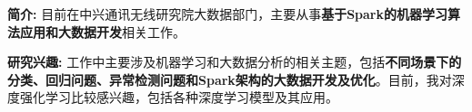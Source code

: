 %
%

\par{
{\textbf{简介:}} 
目前在中兴通讯无线研究院大数据部门，主要从事\textbf{基于Spark的机器学习算法应用和大数据开发}相关工作。


{\textbf{研究兴趣:}} 
工作中主要涉及机器学习和大数据分析的相关主题，包括\textbf{不同场景下的分类、回归问题、异常检测问题和Spark架构的大数据开发及优化}。目前，我对深度强化学习比较感兴趣，包括各种深度学习模型及其应用。
}